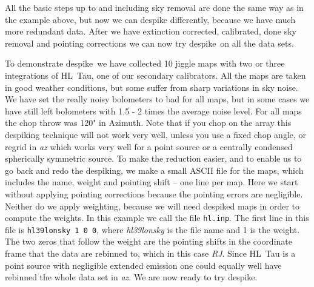 \documentclass[twoside,11pt]{article}
\newcommand{\task}[1]{\textsf{#1}}
\newcommand{\desp}{\xref{\task{despike}}{sun216}{DESPIKE}}
\newcommand{\xref}[3]{#1}
\renewcommand{\_}{\texttt{\symbol{95}}}
\begin{document}
All the basic steps up to and including sky removal are done the same
way as in the example above, but now we can despike differently,
because we have much more redundant data.  After we have extinction
corrected, calibrated, done sky removal and pointing corrections we
can now try \desp\ on all the data sets.


To demonstrate \desp\ we have collected 10 jiggle maps with two or
three integrations of HL~Tau, one of our secondary calibrators.  All
the maps are taken in good weather conditions, but some suffer from
sharp variations in sky noise. We have set the really noisy bolometers
to bad for all maps, but in some cases we have still left bolometers
with 1.5 - 2 times the average noise level.  For all maps the chop
throw was 120" in Azimuth.  Note that if you chop on the array this
despiking technique will not work very well, unless you use a fixed
chop angle, or regrid in {\it az} which works very well for a point
source or a centrally condensed spherically symmetric source. To make
the reduction easier, and to enable us to go back and redo the
despiking, we make a small ASCII file for the maps, which includes the
name, weight and pointing shift -- one line per map.  Here we start
without applying pointing corrections because the pointing errors are
negligible.  Neither do we apply weighting, because we will need
despiked maps in order to compute the weights.  In this example we
call the file \texttt{hl.inp}.  The first line in this file is
\texttt{hl39\_lon\_sky 1 0 0}, where {\it hl39\_lon\_sky} is the file
name and 1 is the weight.  The two zeros that follow the weight are
the pointing shifts in the coordinate frame that the data are rebinned
to, which in this case {\it RJ}. Since HL~Tau is a point source with
negligible extended emission one could equally well have rebinned the
whole data set in {\it az}. We are now ready to try \desp.
\end{document}
